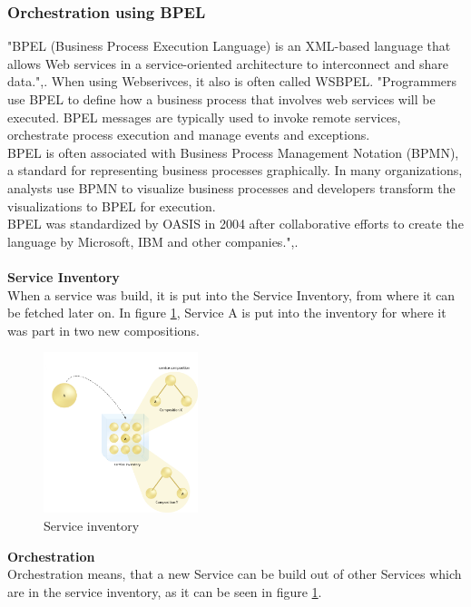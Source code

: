 \documentclass[12pt]{article}
\begin{document}
\subsubsection{Orchestration using BPEL}
\label{sec:bpel}
"BPEL (Business Process Execution Language) is an XML-based language that allows Web services in a service-oriented architecture to interconnect and share data.",\cite{bpelsearchsoa}. When using Webserivces, it also is often called WSBPEL. "Programmers use BPEL to define how a business process that involves web services will be executed. BPEL messages are typically used to invoke remote services, orchestrate process execution and manage events and exceptions.\\
BPEL is often associated with Business Process Management Notation (BPMN), a standard for representing business processes graphically. In many organizations, analysts use BPMN to visualize business processes and developers transform the visualizations to BPEL for execution.\\
BPEL was standardized by OASIS in 2004 after collaborative efforts to create the language by Microsoft, IBM and other companies.",\cite{bpelsearchsoa}.\\
\\
\textbf{Service Inventory}\\
When a service was build, it is put into the Service Inventory, from where it can be fetched later on. In figure \ref{fig:Serviceinventory}, Service A is put into the inventory for where it was part in two new compositions. 
\begin{figure}[here!]
	\centering
	\includegraphics[width=0.4\textwidth]{images/picservi0}
	\caption{Service inventory\cite{picservi}}
	\label{fig:Serviceinventory}
	\end{figure}
	\FloatBarrier \noindent
\textbf{Orchestration}\\
Orchestration means, that a new Service can be build out of other Services which are in the service inventory, as it can be seen in figure \ref{fig:Serviceinventory}. \\
\end{document}
